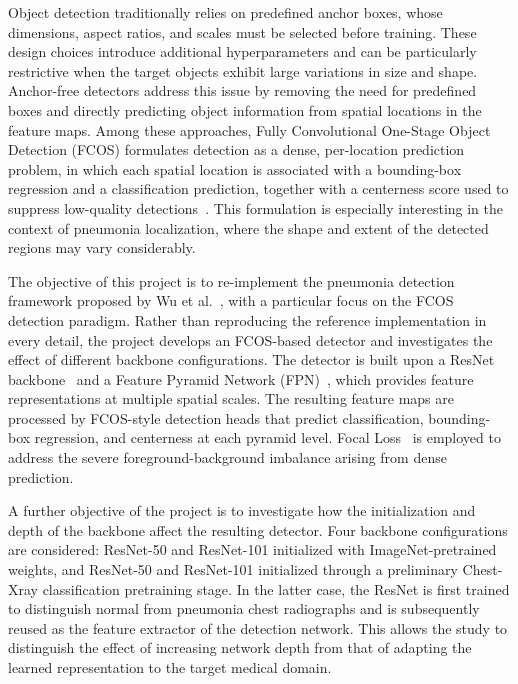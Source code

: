\documentclass[11pt,a4paper]{article}
\begin{document}
Object detection traditionally relies on predefined anchor boxes, whose dimensions, aspect ratios, and scales must be selected before training. 
These design choices introduce additional hyperparameters and can be particularly restrictive when the target objects exhibit large variations in size and shape. 
Anchor-free detectors address this issue by removing the need for predefined boxes and directly predicting object information from spatial locations in the feature maps. 
Among these approaches, Fully Convolutional One-Stage Object Detection (FCOS) formulates detection as a dense, per-location prediction problem, in which each spatial location is associated with a bounding-box regression and a classification prediction, together with a centerness score used to suppress low-quality detections~\cite{tian2019fcos}. 
This formulation is especially interesting in the context of pneumonia localization, where the shape and extent of the detected regions may vary considerably.

The objective of this project is to re-implement the pneumonia detection framework proposed by Wu et al.~\cite{wu2024pneumonia}, with a particular focus on the FCOS detection paradigm. 
Rather than reproducing the reference implementation in every detail, the project develops an FCOS-based detector and investigates the effect of different backbone configurations. 
The detector is built upon a ResNet backbone~\cite{he2016resnet} and a Feature Pyramid Network (FPN)~\cite{lin2017fpn}, which provides feature representations at multiple spatial scales. 
The resulting feature maps are processed by FCOS-style detection heads that predict classification, bounding-box regression, and centerness at each pyramid level. 
Focal Loss~\cite{lin2017focal} is employed to address the severe foreground-background imbalance arising from dense prediction.

A further objective of the project is to investigate how the initialization and depth of the backbone affect the resulting detector. 
Four backbone configurations are considered: ResNet-50 and ResNet-101 initialized with ImageNet-pretrained weights, and ResNet-50 and ResNet-101 initialized through a preliminary Chest-Xray classification pretraining stage. 
In the latter case, the ResNet is first trained to distinguish normal from pneumonia chest radiographs and is subsequently reused as the feature extractor of the detection network. 
This allows the study to distinguish the effect of increasing network depth from that of adapting the learned representation to the target medical domain.
\end{document}
